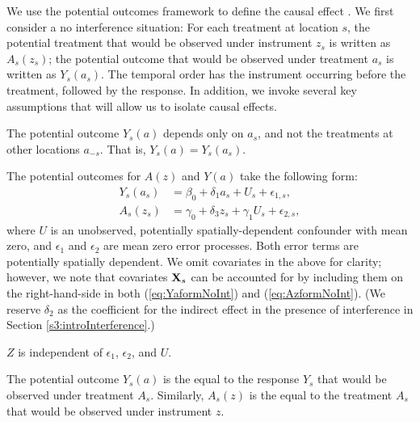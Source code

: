 \documentclass[12pt]{article}
\begin{document}
We use the potential outcomes framework to define the causal effect \citep{rubin1974estimating}. We first consider a no interference situation: For each treatment at location $s$, the potential treatment that would be observed under instrument $z_s$ is written as $A_s(z_s)$; the potential outcome that would be observed under treatment $a_s$ is written as $Y_s(a_s)$. The temporal order has the instrument occurring before the treatment,  followed by the response. In addition, we invoke several key assumptions that will allow us to isolate causal effects. 

\begin{assumption}[No interference] \label{a:noInterference}
The potential outcome $Y_s(a)$ depends only on $a_s$, and not the treatments at other locations $a_{-s}$.  That is, $Y_s(a) = Y_s(a_s)$.
\end{assumption}

\begin{assumption}
The potential outcomes for $A(z)$ and $Y(a)$ take the following form:
\begin{align}
  Y_s(a_s) &= \beta_0 + \delta_1 a_s + U_s + \epsilon_{1,s}, \label{eq:YaformNoInt}\\
    A_s(z_s) &= \gamma_0 + \delta_3 z_s + \gamma_1 U_s + \epsilon_{2,s},\label{eq:AzformNoInt}
\end{align}
where $U$ is an unobserved, potentially spatially-dependent confounder with mean zero, and $\epsilon_1$ and $\epsilon_2$ are mean zero error processes. Both error terms are potentially spatially dependent. We omit covariates in the above for clarity; however, we note that covariates $\mathbf{X}_s$ can be accounted for by including them on the right-hand-side in both (\ref{eq:YaformNoInt}) and (\ref{eq:AzformNoInt}). (We reserve $\delta_2$ as the coefficient for the indirect effect in the presence of interference in Section \ref{s3:introInterference}.)
\end{assumption}


\begin{assumption}\label{a:validIV}
$Z$ is independent of $\epsilon_1$, $\epsilon_2$, and $U$.  
\end{assumption}


\begin{assumption}[Consistency] 
The potential outcome $Y_s(a)$ is the equal to the response $Y_s$ that would be observed under treatment $A_s$. Similarly, $A_s(z)$ is the equal to the treatment $A_s$ that would be observed under instrument $z$.
\end{assumption}
\end{document}

